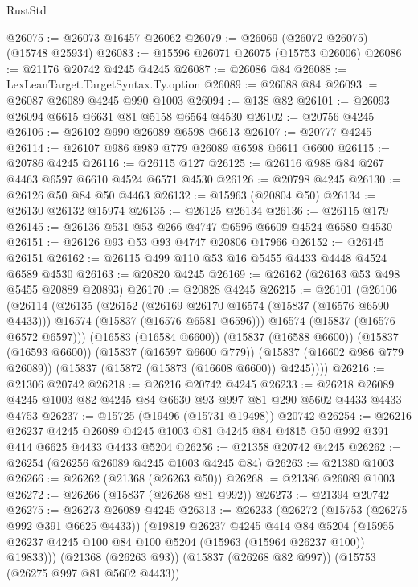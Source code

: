 \begin{lexlean}{RustStd}
\begin{coremodule}
@26075 := @26073 @16457 @26062
@26079 := @26069 (@26072 @26075) (@15748 @25934)
@26083 := @15596 @26071 @26075 (@15753 @26006)
@26086 := @21176 @20742 @4245 @4245
@26087 := @26086 @84
@26088 := LexLeanTarget.TargetSyntax.Ty.option
@26089 := @26088 @84
@26093 := @26087 @26089 @4245 @990 @1003
@26094 := @138 @82
@26101 := @26093 @26094 @6615 @6631 @81 @5158 @6564 @4530
@26102 := @20756 @4245
@26106 := @26102 @990 @26089 @6598 @6613
@26107 := @20777 @4245
@26114 := @26107 @986 @989 @779 @26089 @6598 @6611 @6600
@26115 := @20786 @4245
@26116 := @26115 @127
@26125 := @26116 @988 @84 @267 @4463 @6597 @6610 @4524 @6571 @4530
@26126 := @20798 @4245
@26130 := @26126 @50 @84 @50 @4463
@26132 := @15963 (@20804 @50)
@26134 := @26130 @26132 @15974
@26135 := @26125 @26134
@26136 := @26115 @179
@26145 := @26136 @531 @53 @266 @4747 @6596 @6609 @4524 @6580 @4530
@26151 := @26126 @93 @53 @93 @4747 @20806 @17966
@26152 := @26145 @26151
@26162 := @26115 @499 @110 @53 @16 @5455 @4433 @4448 @4524 @6589 @4530
@26163 := @20820 @4245
@26169 := @26162 (@26163 @53 @498 @5455 @20889 @20893)
@26170 := @20828 @4245
@26215 := @26101
    (@26106
      (@26114
        (@26135
          (@26152
            (@26169 @26170 @16574 (@15837 (@16576 @6590 @4433)))
            @16574
            (@15837 (@16576 @6581 @6596)))
          @16574
          (@15837 (@16576 @6572 @6597)))
        (@16583 (@16584 @6600))
        (@15837 (@16588 @6600))
        (@15837 (@16593 @6600))
        (@15837 (@16597 @6600 @779))
        (@15837 (@16602 @986 @779 @26089))
        (@15837 (@15872 (@15873 (@16608 @6600)) @4245))))
@26216 := @21306 @20742
@26218 := @26216 @20742 @4245
@26233 := @26218 @26089 @4245 @1003 @82 @4245 @84 @6630 @93 @997 @81 @290 @5602 @4433 @4433 @4753
@26237 := @15725 (@19496 (@15731 @19498)) @20742
@26254 := @26216
    @26237
    @4245
    @26089
    @4245
    @1003
    @81
    @4245
    @84
    @4815
    @50
    @992
    @391
    @414
    @6625
    @4433
    @4433
    @5204
@26256 := @21358 @20742 @4245
@26262 := @26254 (@26256 @26089 @4245 @1003 @4245 @84)
@26263 := @21380 @1003
@26266 := @26262 (@21368 (@26263 @50))
@26268 := @21386 @26089 @1003
@26272 := @26266 (@15837 (@26268 @81 @992))
@26273 := @21394 @20742
@26275 := @26273 @26089 @4245
@26313 := @26233
    (@26272
      (@15753 (@26275 @992 @391 @6625 @4433))
      (@19819
        @26237
        @4245
        @414
        @84
        @5204
        (@15955 @26237 @4245 @100 @84 @100 @5204 (@15963 (@15964 @26237 @100)) @19833)))
    (@21368 (@26263 @93))
    (@15837 (@26268 @82 @997))
    (@15753 (@26275 @997 @81 @5602 @4433))

\end{coremodule}
\end{lexlean}
